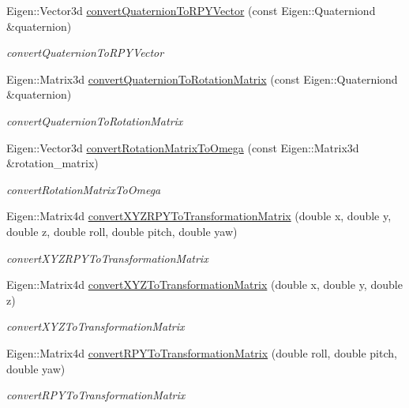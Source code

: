 \begin{DoxyCompactItemize}
Eigen\+::\+Vector3d \hyperlink{namespacerobotis__manipulator_1_1math_a5d6107f6a65d430f3eee81f93327c37a}{convert\+Quaternion\+To\+R\+P\+Y\+Vector} (const Eigen\+::\+Quaterniond \&quaternion)
\begin{DoxyCompactList}\small\item\em convert\+Quaternion\+To\+R\+P\+Y\+Vector \end{DoxyCompactList}\item 
Eigen\+::\+Matrix3d \hyperlink{namespacerobotis__manipulator_1_1math_a7a7c421fe85e75a3897a4c0c492bb662}{convert\+Quaternion\+To\+Rotation\+Matrix} (const Eigen\+::\+Quaterniond \&quaternion)
\begin{DoxyCompactList}\small\item\em convert\+Quaternion\+To\+Rotation\+Matrix \end{DoxyCompactList}\item 
Eigen\+::\+Vector3d \hyperlink{namespacerobotis__manipulator_1_1math_a0659ad2d283ad43e01eca23f0be6a134}{convert\+Rotation\+Matrix\+To\+Omega} (const Eigen\+::\+Matrix3d \&rotation\+\_\+matrix)
\begin{DoxyCompactList}\small\item\em convert\+Rotation\+Matrix\+To\+Omega \end{DoxyCompactList}\item 
Eigen\+::\+Matrix4d \hyperlink{namespacerobotis__manipulator_1_1math_a5f001cf17bbf0daaaacd46f58d3f6e8a}{convert\+X\+Y\+Z\+R\+P\+Y\+To\+Transformation\+Matrix} (double x, double y, double z, double roll, double pitch, double yaw)
\begin{DoxyCompactList}\small\item\em convert\+X\+Y\+Z\+R\+P\+Y\+To\+Transformation\+Matrix \end{DoxyCompactList}\item 
Eigen\+::\+Matrix4d \hyperlink{namespacerobotis__manipulator_1_1math_a0e864bea906520574b93496db74427f0}{convert\+X\+Y\+Z\+To\+Transformation\+Matrix} (double x, double y, double z)
\begin{DoxyCompactList}\small\item\em convert\+X\+Y\+Z\+To\+Transformation\+Matrix \end{DoxyCompactList}\item 
Eigen\+::\+Matrix4d \hyperlink{namespacerobotis__manipulator_1_1math_a82a56f3cb0404e06bf37f2e167c839ef}{convert\+R\+P\+Y\+To\+Transformation\+Matrix} (double roll, double pitch, double yaw)
\begin{DoxyCompactList}\small\item\em convert\+R\+P\+Y\+To\+Transformation\+Matrix \end{DoxyCompactList}\item 

\end{DoxyCompactItemize}
